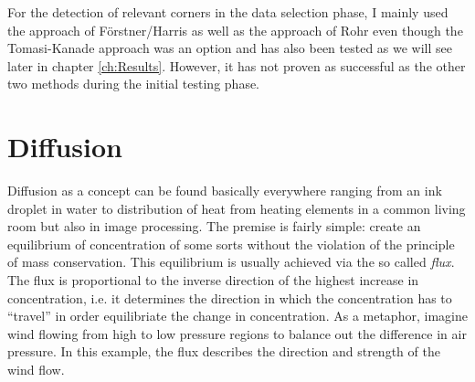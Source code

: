 For the detection of relevant corners in the data selection phase, I mainly used the approach of F\"orstner/Harris as well as
the approach of Rohr even though the Tomasi-Kanade approach was an option and has also been
tested as we will see later in chapter \ref{ch:Results}. However, it has not proven as successful
as the other two methods during the initial testing phase.
\section{Diffusion}\label{sec:Diffusion}
Diffusion as a concept can be found basically everywhere ranging from an ink droplet in water to
distribution of heat from heating elements in a common living room but also in image processing.
The premise is fairly simple: create an equilibrium of concentration of some sorts without the violation of the principle of
mass conservation.
This equilibrium is usually achieved via the so called \textit{flux}. The flux is proportional to
the inverse direction of the highest increase in concentration, i.e. it determines the direction in
which the concentration has to ``travel'' in order equilibriate the change in
concentration\cite{weickert96}.
As a metaphor, imagine wind flowing from high to low pressure regions to balance out the difference
in air pressure. In this example, the flux describes the direction and strength of the wind flow.
